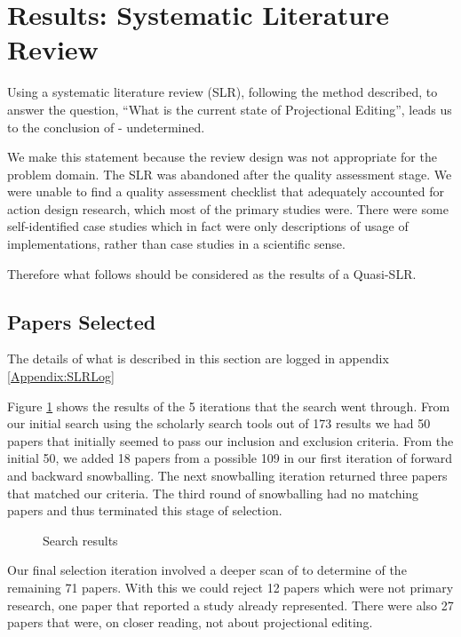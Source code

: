 \section{Results: Systematic Literature Review}
\label{section:Results_SLR}

Using a systematic literature review (SLR), following the method described, to answer the question, ``What is the current state of Projectional Editing'', leads us to the conclusion of - undetermined.

We make this statement because the review design was not appropriate for the problem domain.
The SLR was abandoned after the quality assessment stage.
We were unable to find a quality assessment checklist that adequately accounted for action design research, which most of the primary studies were.
There were some self-identified case studies which in fact were only descriptions of usage of implementations, rather than case studies in a scientific sense.

Therefore what follows should be considered as the results of a Quasi-SLR.

\subsection{Papers Selected}
The details of what is described in this section are logged in appendix \ref{Appendix:SLRLog}

Figure \ref{fig:search_results} shows the results of the 5 iterations that the search went through.
From our initial search using the scholarly search tools out of 173 results we had 50 papers that initially seemed to pass our inclusion and exclusion criteria.
From the initial 50, we added 18 papers from a possible 109 in our first iteration of forward and backward snowballing.
The next snowballing iteration returned three papers that matched our criteria.
The third round of snowballing had no matching papers and thus terminated this stage of selection.

\begin{figure}[htbp]
    \centering
    \caption{Search results}
    \label{fig:search_results}
\end{figure}


Our final selection iteration involved a deeper scan of to determine of the remaining 71 papers.
With this we could reject 12 papers which were not primary research, one paper that reported a study already represented.
There were also 27 papers that were, on closer reading, not about projectional editing.

